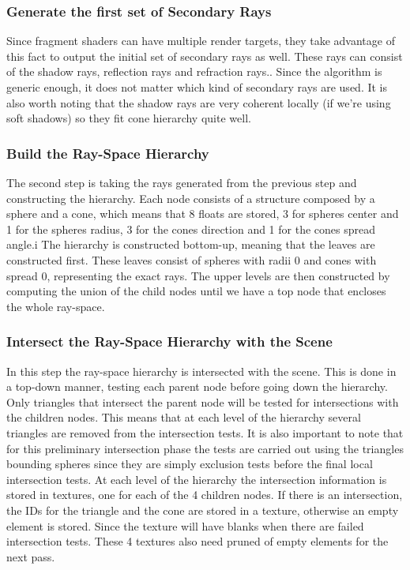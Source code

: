 \subsubsection{Generate the first set of Secondary Rays}

Since fragment shaders can have multiple render targets, they take advantage of this fact to output the initial set of secondary rays as well. These rays can consist of the shadow rays, reflection rays and refraction rays.. Since the algorithm is generic enough, it does not matter which kind of secondary rays are used. It is also worth noting that the shadow rays are very coherent locally (if we're using soft shadows) so they fit cone hierarchy quite well.

\subsubsection{Build the Ray-Space Hierarchy}

The second step is taking the rays generated from the previous step and constructing the hierarchy. Each node consists of a structure composed by a sphere and a cone, which means that 8 floats are stored, 3 for spheres center and 1 for the spheres radius, 3 for the cones direction and 1 for the cones spread angle.i The hierarchy is constructed bottom-up, meaning that the leaves are constructed first. These leaves consist of spheres with radii 0 and cones with spread 0, representing the exact rays. The upper levels are then constructed by computing the union of the child nodes until we have a top node that encloses the whole ray-space.

\subsubsection{Intersect the Ray-Space Hierarchy with the Scene}

In this step the ray-space hierarchy is intersected with the scene. This is done in a top-down manner, testing each parent node before going down the hierarchy. Only triangles that intersect the parent node will be tested for intersections with the children nodes. This means that at each level of the hierarchy several triangles are removed from the intersection tests. It is also important to note that for this preliminary intersection phase the tests are carried out using the triangles bounding spheres since they are simply exclusion tests before the final local intersection tests. At each level of the hierarchy the intersection information is stored in textures, one for each of the 4 children nodes. If there is an intersection, the IDs for the triangle and the cone are stored in a texture, otherwise an empty element is stored. Since the texture will have blanks when there are failed intersection tests. These 4 textures also need pruned of empty elements  for the next pass.

